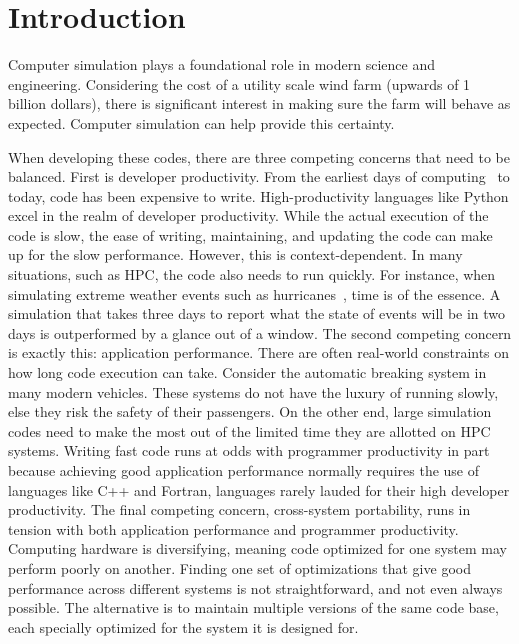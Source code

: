\documentclass{article}
\begin{document}
\section{Introduction}

Computer simulation plays a foundational role in modern science and engineering. 
Considering the cost of a utility scale wind farm (upwards of 1 billion dollars), there is significant interest in making sure the farm will behave as expected.
Computer simulation can help provide this certainty.

When developing these codes, there are three competing concerns that need to be balanced.
First is developer productivity.
From the earliest days of computing~\cite{backus1957fortran} to today, code has been expensive to write.
High-productivity languages like Python excel in the realm of developer productivity.
While the actual execution of the code is slow, the ease of writing, maintaining, and updating the code can make up for the slow performance.
However, this is context-dependent. 
In many situations, such as HPC, the code also needs to run quickly.
For instance, when simulating extreme weather events such as hurricanes~\cite{fu2017redesigning}, time is of the essence. 
A simulation that takes three days to report what the state of events will be in two days is outperformed by a glance out of a window.
The second competing concern is exactly this: application performance.
There are often real-world constraints on how long code execution can take.
Consider the automatic breaking system in many modern vehicles.
These systems do not have the luxury of running slowly, else they risk the safety of their passengers.
On the other end, large simulation codes need to make the most out of the limited time they are allotted on HPC systems.
Writing fast code runs at odds with programmer productivity in part because achieving good application performance normally requires the use of languages like C++ and Fortran, languages rarely lauded for their high developer productivity.
The final competing concern, cross-system portability, runs in tension with both application performance and programmer productivity.
Computing hardware is diversifying, meaning code optimized for one system may perform poorly on another.
Finding one set of optimizations that give good performance across different systems is not straightforward, and not even always possible.
The alternative is to maintain multiple versions of the same code base, each specially optimized for the system it is designed for.
\end{document}
